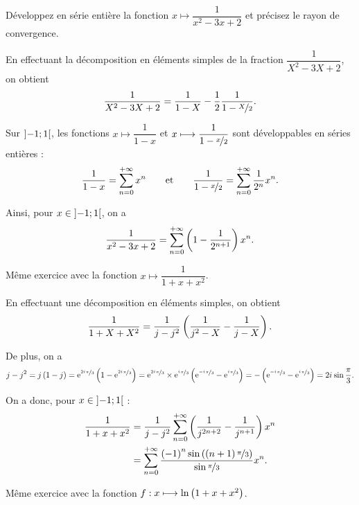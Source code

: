 \begin{exo}
Développez en série entière la fonction \(x\mapsto\dfrac{1}{x^2-3x+2}\) et précisez le rayon de convergence.
\end{exo}

\begin{corr}
En effectuant la décomposition en éléments simples de la fraction \(\dfrac{1}{X^2-3X+2}\), on obtient \[\dfrac{1}{X^2-3X+2}=\dfrac{1}{1-X}-\dfrac{1}{2}\dfrac{1}{1-\nicefrac{X}{2}}.\]

Sur \(\intervee{-1}{1}\), les fonctions \(x\mapsto\dfrac{1}{1-x}\) et \(x\mapsto\dfrac{1}{1-\nicefrac{x}{2}}\) sont développables en séries entières : \[\dfrac{1}{1-x}=\sum_{n=0}^{\pinf}x^n\qquad\text{et}\qquad\dfrac{1}{1-\nicefrac{x}{2}}=\sum_{n=0}^{\pinf}\dfrac{1}{2^n}x^n.\]

Ainsi, pour \(x\in\intervee{-1}{1}\), on a \[\dfrac{1}{x^2-3x+2}=\sum_{n=0}^{\pinf}\paren{1-\dfrac{1}{2^{n+1}}}x^n.\]
\end{corr}

\begin{exo}
Même exercice avec la fonction \(x\mapsto\dfrac{1}{1+x+x^2}\).
\end{exo}

\begin{corr}
En effectuant une décomposition en éléments simples, on obtient \[\dfrac{1}{1+X+X^2}=\dfrac{1}{j-j^2}\paren{\dfrac{1}{j^2-X}-\dfrac{1}{j-X}}.\]

De plus, on a \[j-j^2=j\paren{1-j}=\e{\nicefrac{2\i\pi}{3}}\paren{1-\e{\nicefrac{2\i\pi}{3}}}=\e{\nicefrac{2\i\pi}{3}}\times\e{\nicefrac{\i\pi}{3}}\paren{\e{\nicefrac{-\i\pi}{3}}-\e{\nicefrac{\i\pi}{3}}}=-\paren{\e{\nicefrac{-\i\pi}{3}}-\e{\nicefrac{\i\pi}{3}}}=2\i\sin\dfrac{\pi}{3}.\]

On a donc, pour \(x\in\intervee{-1}{1}\) : \[\begin{aligned}
\dfrac{1}{1+x+x^2}&=\dfrac{1}{j-j^2}\sum_{n=0}^{\pinf}\paren{\dfrac{1}{j^{2n+2}}-\dfrac{1}{j^{n+1}}}x^n \\
&=\sum_{n=0}^{\pinf}\dfrac{\paren{-1}^n\sin\paren{\paren{n+1}\nicefrac{\pi}{3}}}{\sin\nicefrac{\pi}{3}}x^n.
\end{aligned}\]
\end{corr}

\begin{exo}
Même exercice avec la fonction \(f:x\mapsto\ln\paren{1+x+x^2}\).
\end{exo}

